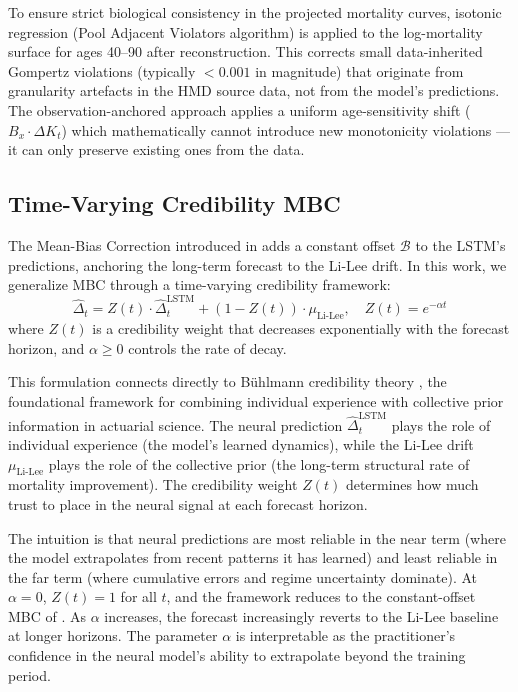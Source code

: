 \documentclass[11pt,a4paper]{article}
\begin{document}
To ensure strict biological consistency in the projected mortality curves, isotonic regression (Pool Adjacent Violators algorithm) is applied to the log-mortality surface for ages 40--90 after reconstruction. This corrects small data-inherited Gompertz violations (typically $< 0.001$ in magnitude) that originate from granularity artefacts in the HMD source data, not from the model's predictions. The observation-anchored approach applies a uniform age-sensitivity shift ($B_x \cdot \Delta K_t$) which mathematically cannot introduce new monotonicity violations --- it can only preserve existing ones from the data.

\subsection{Time-Varying Credibility MBC}\label{sec:credibility}

The Mean-Bias Correction introduced in \cite{rindori2026p04} adds a constant offset $\mathcal{B}$ to the LSTM's predictions, anchoring the long-term forecast to the Li-Lee drift. In this work, we generalize MBC through a time-varying credibility framework:
\begin{equation}\label{eq:credibility}
    \hat{\Delta}_t = Z(t) \cdot \hat{\Delta}_t^{\text{LSTM}} + (1 - Z(t)) \cdot \mu_{\text{Li-Lee}}, \quad Z(t) = e^{-\alpha t}
\end{equation}
where $Z(t)$ is a credibility weight that decreases exponentially with the forecast horizon, and $\alpha \geq 0$ controls the rate of decay.

This formulation connects directly to B\"uhlmann credibility theory \cite{buhlmann1967}, the foundational framework for combining individual experience with collective prior information in actuarial science. The neural prediction $\hat{\Delta}_t^{\text{LSTM}}$ plays the role of individual experience (the model's learned dynamics), while the Li-Lee drift $\mu_{\text{Li-Lee}}$ plays the role of the collective prior (the long-term structural rate of mortality improvement). The credibility weight $Z(t)$ determines how much trust to place in the neural signal at each forecast horizon.

The intuition is that neural predictions are most reliable in the near term (where the model extrapolates from recent patterns it has learned) and least reliable in the far term (where cumulative errors and regime uncertainty dominate). At $\alpha = 0$, $Z(t) = 1$ for all $t$, and the framework reduces to the constant-offset MBC of \cite{rindori2026p04}. As $\alpha$ increases, the forecast increasingly reverts to the Li-Lee baseline at longer horizons. The parameter $\alpha$ is interpretable as the practitioner's confidence in the neural model's ability to extrapolate beyond the training period.
\end{document}
